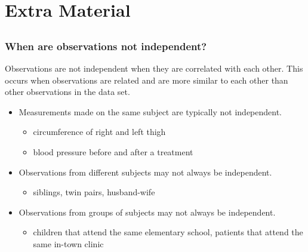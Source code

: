 \appendix
{}
\setcounter{finalframe}{\value{framenumber}}


\section[Extra Material]{Extra Material}

\subsection{}

\begin{frame}[label=independentobs]
\frametitle{When are observations not independent?}
Observations are not independent when they are correlated with each other.  This occurs when observations are related and are more similar to each other than other observations in the data set.
\begin{itemize}
    \item
    Measurements made on the same subject are typically not independent.
    \begin{itemize}
        \item
        circumference of right and left thigh
        \item
        blood pressure before and after a treatment
    \end{itemize}
    \item
    Observations from different subjects may not always be independent.
    \begin{itemize}
        \item
        siblings, twin pairs, husband-wife
    \end{itemize}
    \item
    Observations from groups of subjects may not always be independent.
    \begin{itemize}
        \item
         children that attend the same elementary school, patients that attend the same in-town clinic
    \end{itemize}
\end{itemize}
\begin{flushright}
\hyperlink{assumptions}{}
\end{flushright}
\end{frame}

 